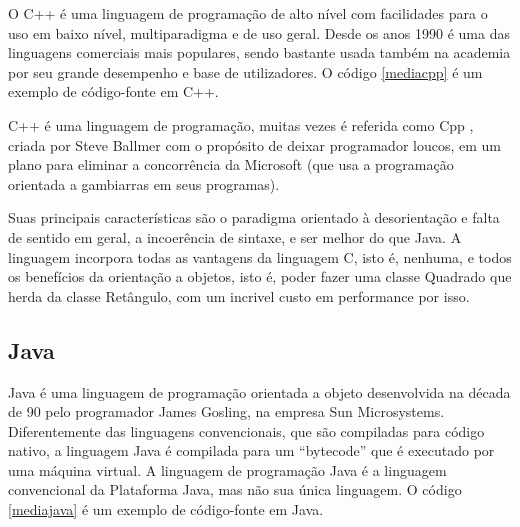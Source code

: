 O C++ é uma linguagem de programação de alto nível com facilidades para o uso em baixo nível, multiparadigma e de uso geral. Desde os anos 1990 é uma das linguagens comerciais mais populares, sendo bastante usada também na academia por seu grande desempenho e base de utilizadores.  O código \ref{mediacpp} é um exemplo de código-fonte em C++.



C++ é uma linguagem de programação, muitas vezes é referida como Cpp , criada por Steve Ballmer com o propósito de deixar programador loucos, em um plano para eliminar a concorrência da Microsoft (que usa a programação orientada a gambiarras em seus programas).

Suas principais características são o paradigma orientado à desorientação e falta de sentido em geral, a incoerência de sintaxe, e ser melhor do que Java. A linguagem incorpora todas as vantagens da linguagem C, isto é, nenhuma, e todos os benefícios da orientação a objetos, isto é, poder fazer uma classe Quadrado que herda da classe Retângulo, com um incrivel custo em performance por isso. 

\subsection{Java}

Java é uma linguagem de programação orientada a objeto desenvolvida na década de 90 pelo programador James Gosling, na empresa Sun Microsystems. Diferentemente das linguagens convencionais, que são compiladas para código nativo, a linguagem Java é compilada para um ``bytecode'' que é executado por uma máquina virtual. A linguagem de programação Java é a linguagem convencional da Plataforma Java, mas não sua única linguagem.  O código \ref{mediajava} é um exemplo de código-fonte em Java.



